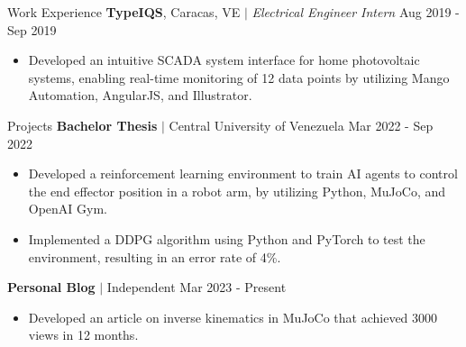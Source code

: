 \documentclass{resume} %
\begin{document}
\begin{rSection}{Work Experience}
    \textbf{TypeIQS}, Caracas, VE $\mid$ \textit{Electrical Engineer Intern} \hfill Aug 2019 - Sep 2019

    \begin{itemize}
        \item Developed an intuitive SCADA system interface for home photovoltaic systems, enabling real-time monitoring of 12 data points by utilizing Mango Automation, AngularJS, and Illustrator.
    
    \end{itemize}

\end{rSection}


\begin{rSection}{Projects}
    \textbf{Bachelor Thesis} $\mid$ Central University of Venezuela \hfill Mar 2022 - Sep 2022
    
    \begin{itemize}
        \item Developed a reinforcement learning environment to train AI agents to control the end effector position in a robot arm, by utilizing Python, MuJoCo, and OpenAI Gym.

        \item Implemented a DDPG algorithm using Python and PyTorch to test the environment, resulting in an error rate of 4\%.

    
    \end{itemize}

    \textbf{Personal Blog} $\mid$ Independent \hfill Mar 2023 - Present
    
    \begin{itemize}
        \item Developed an article on inverse kinematics in MuJoCo that achieved 3000 views in 12 months.

    \end{itemize}
    
\end{rSection}
\end{document}
